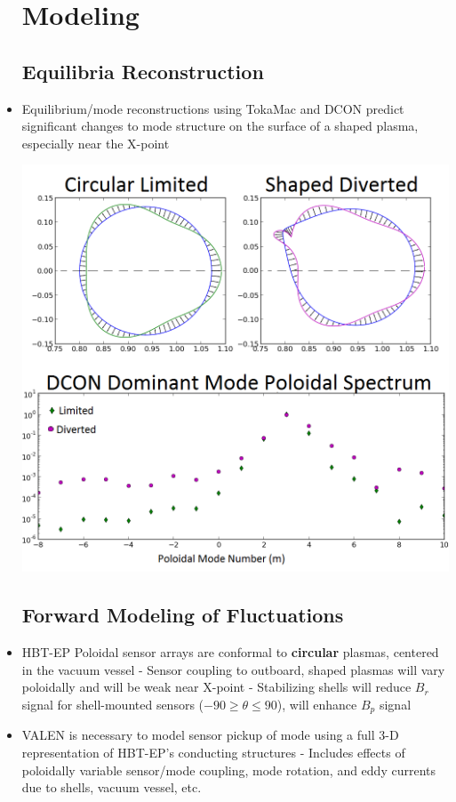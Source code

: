 \documentclass{article}
\begin{document}
\begin{multicols}{5}
\begin{itemize}
\section{Modeling}
\subsection{Equilibria Reconstruction}
\item Equilibrium/mode reconstructions using TokaMac and DCON predict significant changes to mode structure on the surface of a shaped plasma, especially near the X-point
\begin{center}

\includegraphics[width=1\columnwidth]{Dcon_surfaces_n1_dom_85385_85402}\\

\end{center}

\subsection{Forward Modeling of Fluctuations}
\item HBT-EP Poloidal sensor arrays are conformal to \textbf{circular} plasmas, centered in the vacuum vessel
\subitem - Sensor coupling to outboard, shaped plasmas will vary poloidally and will be weak near X-point
\subitem - Stabilizing shells will reduce $B_r$ signal for shell-mounted sensors ($-90 \geq \theta	\leq 90$), will enhance $B_p$ signal
\item VALEN is necessary to model sensor pickup of mode using a full 3-D representation of HBT-EP's conducting structures
\subitem - Includes effects of poloidally variable sensor/mode coupling, mode rotation, and eddy currents due to shells, vacuum vessel, etc.


\end{itemize}
\end{multicols}
\end{document}

